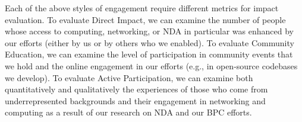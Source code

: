\documentclass[10pt]{article}
\begin{document}
Each of the above styles of engagement require different metrics for impact evaluation.  To evaluate Direct Impact, we can examine the number of people whose access to computing, networking, or NDA in particular was enhanced by our efforts (either by us or by others who we enabled).  To evaluate Community Education, we can examine the level of participation in community events that we hold and the online engagement in our efforts (e.g., in open-source codebases we develop).  To evaluate Active Participation, we can examine both quantitatively and qualitatively the experiences of those who come from underrepresented backgrounds and their engagement in networking and computing as a result of our research on NDA and our BPC efforts.
\end{document}
